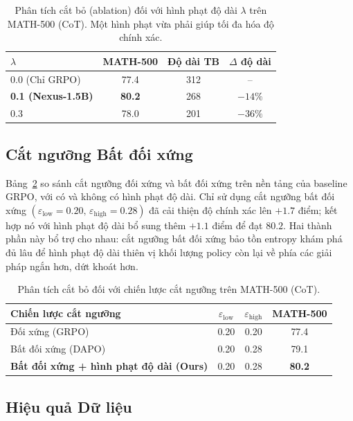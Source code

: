 \documentclass[11pt,a4paper]{article}
\begin{document}
\begin{table}[h]
\centering
\begin{tabular}{lccc}
\toprule
\(\lambda\) & MATH-500 & Độ dài TB & \(\Delta\) độ dài \\
\midrule
0.0 (Chỉ GRPO) & 77.4 & 312 & -- \\
\textbf{0.1 (Nexus-1.5B)} & \textbf{80.2} & 268 & \(-14\%\) \\
0.3 & 78.0 & 201 & \(-36\%\) \\
\bottomrule
\end{tabular}
\caption{Phân tích cắt bỏ (ablation) đối với hình phạt độ dài \(\lambda\) trên MATH-500 (CoT). Một hình
phạt vừa phải giúp tối đa hóa độ chính xác.}
\label{tab:ab_lambda}
\end{table}

\subsection{Cắt ngưỡng Bất đối xứng}

Bảng~\ref{tab:ab_clip} so sánh cắt ngưỡng đối xứng và bất đối xứng trên nền tảng của
baseline GRPO, với có và không có hình phạt độ dài. Chỉ sử dụng cắt ngưỡng bất đối xứng
\((\varepsilon_{\text{low}}=0.20,\,\varepsilon_{\text{high}}=0.28)\) đã cải thiện độ chính xác
lên \(+1.7\) điểm; kết hợp nó với hình phạt độ dài bổ sung thêm \(+1.1\)
điểm để đạt \(80.2\). Hai thành phần này bổ trợ cho nhau: cắt ngưỡng bất đối xứng
bảo tồn entropy khám phá đủ lâu để hình phạt độ dài thiên vị
khối lượng policy còn lại về phía các giải pháp ngắn hơn, dứt khoát hơn.

\begin{table}[h]
\centering
\begin{tabular}{lccc}
\toprule
Chiến lược cắt ngưỡng & \(\varepsilon_{\text{low}}\) & \(\varepsilon_{\text{high}}\) & MATH-500 \\
\midrule
Đối xứng (GRPO) & 0.20 & 0.20 & 77.4 \\
Bất đối xứng (DAPO) & 0.20 & 0.28 & 79.1 \\
\textbf{Bất đối xứng + hình phạt độ dài (Ours)} & 0.20 & 0.28 & \textbf{80.2} \\
\bottomrule
\end{tabular}
\caption{Phân tích cắt bỏ đối với chiến lược cắt ngưỡng trên MATH-500 (CoT).}
\label{tab:ab_clip}
\end{table}

\subsection{Hiệu quả Dữ liệu}
\end{document}
